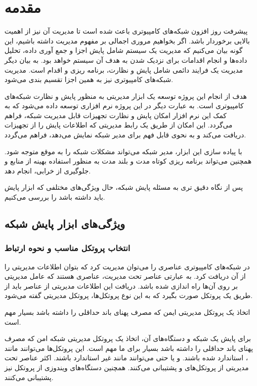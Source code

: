 \thispagestyle{empty}
\chapter{مقدمه}

پیشرفت روز افزون شبکه‌های کامپیوتری باعث شده است تا مدیریت آن نیز از اهمیت بالایی برخوردار باشد. اگر بخواهیم مروری اجمالی بر مفهوم مدیریت داشته باشیم، این گونه بیان می‌کنیم که مدیریت یک سیستم شامل پایش اجزا و جمع آوری داده، تحلیل داده‌ها و انجام اقدامات برای نزدیک شدن به هدف آن سیستم خواهد بود. به بیان دیگر مدیریت یک فرایند دائمی شامل پایش و نظارت، برنامه ریزی و اقدام است. مدیریت شبکه‌های کامپیوتری نیز به همین اجزا تقسیم بندی می‌شود.


هدف از انجام این پروژه توسعه یک ابزار مدیریتی به منظور پایش و نظارت شبکه‌های کامپیوتری است. به عبارت دیگر در این پروژه نرم افزاری توسعه داده می‌شود که به کمک این نرم افزار امکان پایش و نظارت تجهیزات قابل مدیریت شبکه، فراهم می‌گردد. این امکان از طریق یک رابط مدیریتی که اطلاعات پایش را از تجهیزات دریافت می‌کند و به نحوی قابل فهم برای مدیر شبکه نمایش می‌دهد، فراهم می‌گردد\cite{mauro2005essential}.

با پیاده سازی این ابزار، مدیر شبکه می‌تواند مشکلات شبکه را به موقع متوجه شود. همچنین می‌تواند برنامه ریزی کوتاه مدت و بلند مدت به منظور استفاده بهینه از منابع و جلوگیری از خرابی، انجام دهد.

پس از نگاه دقیق تری به مسئله پایش شبکه، حال ویژگی‌های مختلفی که ابزار پایش باید داشته باشد را بررسی می‌کنیم.

\section{ویژگی‌های ابزار پایش شبکه}

\subsection{انتخاب پروتکل مناسب و نحوه ارتباط}

در شبکه‌های کامپیوتری عناصری را می‌توان مدیریت کرد که بتوان اطلاعات مدیریتی را از آن دریافت کرد. به عبارتی عناصر تحت مدیریت، عناصری هستند که عامل مدیریتی بر روی آن‌ها راه اندازی شده باشد. دریافت این اطلاعات مدیریتی از عناصر باید از طریق یک پروتکل صورت بگیرد که به این نوع پروتکل‌ها، پروتکل مدیریتی گفته می‌شود.

اتخاذ یک پروتکل مدیریتی ایمن که مصرف پهنای باند حداقلی را داشته باشد بسیار مهم است.

\newpage

برای پایش یک شبکه و دستگاه‌های آن، اتخاذ یک پروتکل مدیریتی شبکه امن که مصرف پهنای باند حداقلی را داشته باشد بسیار برای ما مهم است. این پروتکل‌ها می‌توانند مانند ، استاندارد شده باشند. و یا حتی می‌توانند مانند  غیر استاندارد باشند. اکثر عناصر تحت مدیریتی از پروتکل‌های  و  پشتیبانی می‌کنند. همچنین دستگاه‌های ویندوزی از پروتکل  نیز پشتیبانی می‌کنند.

